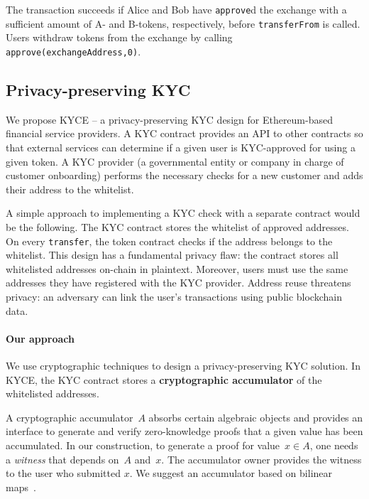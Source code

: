 The transaction succeeds if Alice and Bob have \texttt{approve}d the exchange with a sufficient amount of A- and B-tokens, respectively, before \texttt{transferFrom} is called.
Users withdraw tokens from the exchange by calling \texttt{approve(exchangeAddress,0)}.



\subsection{Privacy-preserving KYC}
\label{sec:PrivacyPreservingKYC}

We propose KYCE -- a privacy-preserving KYC design for Ethereum-based financial service providers.
A KYC contract provides an API to other contracts so that external services can determine if a given user is KYC-approved for using a given token.
A KYC provider (a governmental entity or company in charge of customer onboarding) performs the necessary checks for a new customer and adds their address to the whitelist.

A simple approach to implementing a KYC check with a separate contract would be the following.
The KYC contract stores the whitelist of approved addresses.
On every \texttt{transfer}, the token contract checks if the address belongs to the whitelist.
This design has a fundamental privacy flaw: the contract stores all whitelisted addresses on-chain in plaintext.
Moreover, users must use the same addresses they have registered with the KYC provider.
Address reuse threatens privacy: an adversary can link the user's transactions using public blockchain data.

\paragraph{Our approach}
We use cryptographic techniques to design a privacy-preserving KYC solution.
In KYCE, the KYC contract stores a \textbf{cryptographic accumulator} of the whitelisted addresses.

A cryptographic accumulator~$A$ absorbs certain algebraic objects and provides an interface to generate and verify zero-knowledge proofs that a given value has been accumulated.
In our construction, to generate a proof for value~$x\in A$, one needs a \textit{witness} that depends on~$A$ and~$x$.
The accumulator owner provides the witness to the user who submitted $x$.
We suggest an accumulator based on bilinear maps~\cite{Camenisch2009}.

